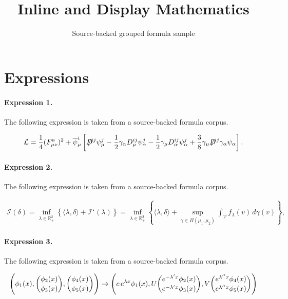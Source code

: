 \documentclass[11pt]{article}
\title{Inline and Display Mathematics}
\author{Source-backed grouped formula sample}
\date{}
\begin{document}
\maketitle
\section{Expressions}
\paragraph{Expression 1.} The following expression is taken from a source-backed formula corpus.

\begin{align*}{\cal L}=\frac{1}{4}(F_{\mu \nu }^{a})^{2}+\overline{\psi }_{\mu }^{i}\left[D\!\!\!\!\slash^{ij}\psi _{\mu }^{j}-\frac{1}{2}\gamma _{\alpha }D_{\mu}^{ij}\psi _{\alpha }^{j}-\frac{1}{2}\gamma _{\mu }D_{\alpha }^{ij}\psi_{\alpha }^{j}+\frac{3}{8}\gamma _{\mu }D\!\!\!\!\slash^{ij}\gamma _{\alpha}\psi _{\alpha }\right] .\end{align*}

\paragraph{Expression 2.} The following expression is taken from a source-backed formula corpus.

\begin{align*}\mathcal{I}(\delta) = \inf_{\lambda \in \mathbb{R}^2_+} \left\{ \langle \lambda, \delta \rangle + \mathcal{I}^{\star}(\lambda) \right\} = \inf_{\lambda \in \mathbb{R}^2_+} \left\{ \langle \lambda, \delta \rangle + \sup _{\gamma \in \Pi\left(\mu_1, \mu_2\right)} \int_{\mathcal{V}} f_\lambda(v) \, d \gamma(v) \right\},\end{align*}

\paragraph{Expression 3.} The following expression is taken from a source-backed formula corpus.

\begin{align*}\Biggl( \phi_1(x), {\phi_2(x)\choose\phi_3(x)},{\phi_4(x)\choose\phi_5(x)} \Biggr) \rightarrow \Biggl( c\, e\sp{\lambda x} \phi_1(x), U {e\sp{-\lambda\sp\prime x}\phi_2(x)\choose e\sp{-\lambda\sp\prime x}\phi_3(x)},V {e\sp{\lambda\sp{\prime\prime}x} \phi_4(x)\choose e\sp{\lambda\sp{\prime\prime}x} \phi_5(x)} \Biggr)\end{align*}
\end{document}
